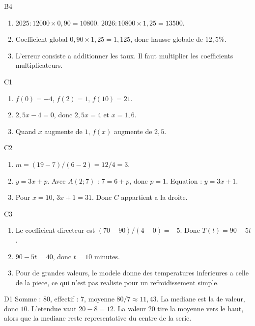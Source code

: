 \documentclass[11pt,a4paper]{article}
\begin{document}
\begin{corrige}{B4}
\begin{enumerate}
    \item $2025:12000\times0,90=10800$. $2026:10800\times1,25=13500$.
    \item Coefficient global $0,90\times1,25=1,125$, donc hausse globale de $12,5\%$.
    \item L'erreur consiste a additionner les taux. Il faut multiplier les coefficients multiplicateurs.
\end{enumerate}
\end{corrige}

\begin{corrige}{C1}
\begin{enumerate}
    \item $f(0)=-4$, $f(2)=1$, $f(10)=21$.
    \item $2,5x-4=0$, donc $2,5x=4$ et $x=1,6$.
    \item Quand $x$ augmente de $1$, $f(x)$ augmente de $2,5$.
\end{enumerate}
\end{corrige}

\begin{corrige}{C2}
\begin{enumerate}
    \item $m=(19-7)/(6-2)=12/4=3$.
    \item $y=3x+p$. Avec $A(2;7)$ : $7=6+p$, donc $p=1$. Equation : $y=3x+1$.
    \item Pour $x=10$, $3x+1=31$. Donc $C$ appartient a la droite.
\end{enumerate}
\end{corrige}

\begin{corrige}{C3}
\begin{enumerate}
    \item Le coefficient directeur est $(70-90)/(4-0)=-5$. Donc $T(t)=90-5t$.
    \item $90-5t=40$, donc $t=10$ minutes.
    \item Pour de grandes valeurs, le modele donne des temperatures inferieures a celle de la piece, ce qui n'est pas realiste pour un refroidissement simple.
\end{enumerate}
\end{corrige}

\begin{corrige}{D1}
Somme : $80$, effectif : $7$, moyenne $80/7\approx11,43$. La mediane est la 4e valeur, donc $10$. L'etendue vaut $20-8=12$. La valeur $20$ tire la moyenne vers le haut, alors que la mediane reste representative du centre de la serie.
\end{corrige}
\end{document}
